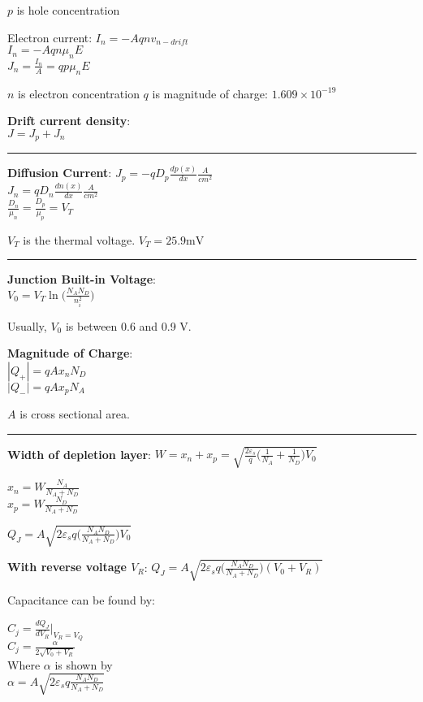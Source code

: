 \documentclass[a4paper]{article}
\begin{document}
\begin{multicols}{3}
$p$ is hole concentration

Electron current:
$I_n = -Aqnv_{n-drift}$\\
$I_n = -Aqn\mu_n E$\\
$J_n = \frac{I_n}{A} = qp\mu_n E$

$n$ is electron concentration
$q$ is magnitude of charge: $1.609 \times 10^{-19}$

\textbf{Drift current density}: \\
$J = J_p + J_n$

\hrule

\textbf{Diffusion Current}:
$J_p = -q D_p \frac{dp(x)}{dx} \frac{A}{cm^2}$\\
$J_n = q D_n \frac{dn(x)}{dx} \frac{A}{cm^2}$\\

$\frac{D_n}{\mu_n} = \frac{D_p}{\mu_p} = V_T$

$V_T$ is the thermal voltage.
$V_T = 25.9 \si{\mV}$

\hrule

\textbf{Junction Built-in Voltage}:\\
$V_0 = V_T \ln \Big( \frac{N_A N_D}{n_i^2} \Big)$

Usually, $V_0$ is between 0.6 and 0.9 V.

\textbf{Magnitude of Charge}:\\
$|Q_+| = qAx_n N_D$\\
$|Q_-| = qAx_p N_A$

$A$ is cross sectional area.

\hrule

\textbf{Width of depletion layer}:
$W = x_n + x_p = \sqrt{\frac{2 \varepsilon_s}{q} \Big(\frac{1}{N_A} + \frac{1}{N_D} \Big) V_0}$

$x_n = W \frac{N_A}{N_A + N_D} $ \\
$x_p = W \frac{N_D}{N_A + N_D} $

$Q_J = A \sqrt{ 2 \varepsilon_s q \Big( \frac{N_A N_D}{N_A + N_D} \Big) V_0}$

\textbf{With reverse voltage $V_R$}:
$Q_J = A \sqrt{ 2 \varepsilon_s q \Big( \frac{N_A N_D}{N_A + N_D} \Big) (V_0 + V_R)}$

Capacitance can be found by:

$C_j = \frac{dQ_J}{dV_R} \Big|_{V_R = V_Q}$\\
$C_j = \frac{\alpha}{2\sqrt{V_0 + V_R}}$ \\
Where $\alpha$ is shown by \\
$\alpha = A \sqrt{2 \varepsilon_s q \frac{N_A N_D}{N_A + N_D}}$



\end{multicols}
\end{document}
